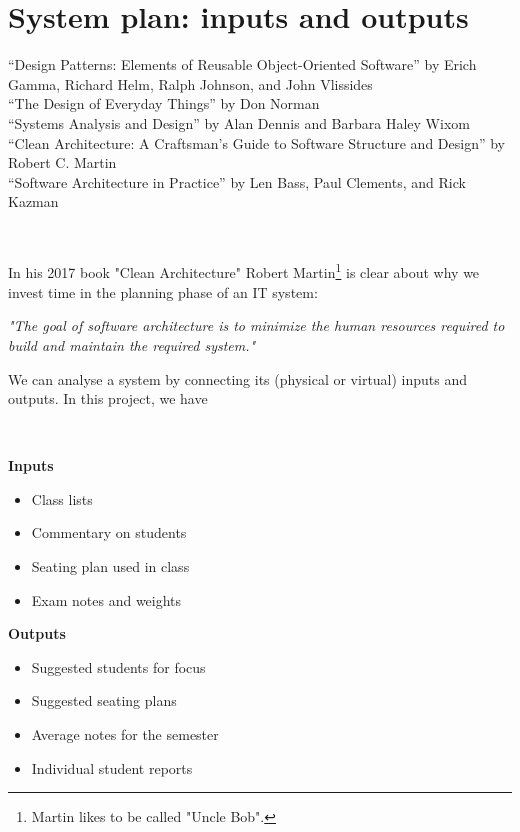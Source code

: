 \documentclass[10pt]{article}
\begin{document}
\section{System plan: inputs and outputs} \label{inout}

“Design Patterns: Elements of Reusable Object-Oriented Software” by Erich Gamma, Richard Helm, Ralph Johnson, and John Vlissides \\
“The Design of Everyday Things” by Don Norman \\
“Systems Analysis and Design” by Alan Dennis and Barbara Haley Wixom\\
“Clean Architecture: A Craftsman’s Guide to Software Structure and Design” by Robert C. Martin\\
“Software Architecture in Practice” by Len Bass, Paul Clements, and Rick Kazman

\

In his 2017 book "Clean Architecture" Robert Martin\footnote{Martin likes to be called "Uncle Bob".} is clear about why we invest time in the planning phase of an IT system:
\begin{center}
\emph{"The goal of software architecture is to minimize the human resources required to build and maintain the required system."} \cite[p. 5]{Mart17}
\end{center}


We can analyse a system by connecting its (physical or virtual) inputs and outputs. In this project, we have

\

\begin{minipage}[t]{0.38\textwidth}

\textbf{Inputs}

\begin{itemize}
\item Class lists
\item Commentary on students
\item Seating plan used in class
\item Exam notes and weights
\end{itemize}


\end{minipage}
\hfill
\vline
\hfill
\begin{minipage}[t]{0.48\textwidth}

\textbf{Outputs}

\begin{itemize}
\item Suggested students for focus
\item Suggested seating plans
\item Average notes for the semester
\item Individual student reports
\end{itemize}

\end{minipage}
\end{document}
